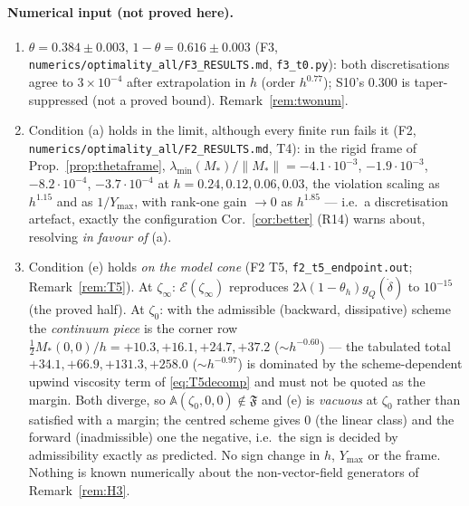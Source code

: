 \documentclass[11pt]{article}
\newcommand{\Aop}{\mathbb A}
\begin{document}
\paragraph{Numerical input (not proved here).}
\begin{enumerate}[leftmargin=1.8em,itemsep=1pt]
\item $\theta=0.384\pm0.003$, $1-\theta=0.616\pm0.003$ (F3,
 \texttt{numerics/optimality\_all/F3\_RESULTS.md}, \texttt{f3\_t0.py}): both
 discretisations agree to $3\times10^{-4}$ after extrapolation in $h$ (order $h^{0.77}$);
 S10's $0.300$ is taper-suppressed (not a proved bound).  Remark~\ref{rem:twonum}.
\item Condition (a) holds in the limit, although every finite run fails it (F2,
 \texttt{numerics/\allowbreak optimality\_\allowbreak all/\allowbreak F2\_RESULTS.md}, T4): in the rigid frame of
 Prop.~\ref{prop:thetaframe}, $\lambda_{\min}(M_*)/\|M_*\|=-4.1\cdot10^{-3}$,
 $-1.9\cdot10^{-3}$, $-8.2\cdot10^{-4}$, $-3.7\cdot10^{-4}$ at $h=0.24,0.12,0.06,0.03$, the
 violation scaling as $h^{1.15}$ and as $1/Y_{\max}$, with rank-one gain $\to0$ as
 $h^{1.85}$ --- i.e.\ a discretisation artefact, exactly the configuration
 Cor.~\ref{cor:better} (R14) warns about, resolving \emph{in favour of} (a).
\item Condition (e) holds \emph{on the model cone} (F2 T5,
 \texttt{f2\_t5\_endpoint.out}; Remark~\ref{rem:T5}).  At $\zeta_\infty$:
 $\mathcal E(\zeta_\infty)$ reproduces $2\lambda(1-\theta_h)g_Q(\dot\delta)$ to $10^{-15}$
 (the proved half).  At $\zeta_0$: with the admissible (backward, dissipative) scheme the
 \emph{continuum piece} is the corner row
 $\frac12M_*(0,0)/h=+10.3,+16.1,+24.7,+37.2$ ($\sim h^{-0.60}$) --- the tabulated total
 $+34.1,+66.9,+131.3,+258.0$ ($\sim h^{-0.97}$) is dominated by the scheme-dependent upwind
 viscosity term of \eqref{eq:T5decomp} and must not be quoted as the margin.  Both diverge,
 so $\Aop(\zeta_0,0,0)\notin\mathfrak F$ and (e) is \emph{vacuous} at $\zeta_0$ rather than
 satisfied with a margin; the centred scheme gives $0$ (the linear class) and the forward
 (inadmissible) one the negative, i.e.\ the sign is decided by admissibility exactly as
 predicted.  No sign change in $h$, $Y_{\max}$ or the frame.  Nothing is known
 numerically about the non-vector-field generators of Remark~\ref{rem:H3}.
\end{enumerate}
\end{document}
